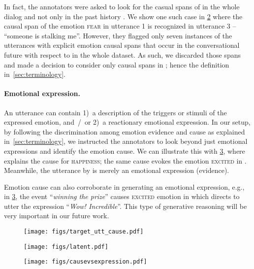 \documentclass[11pt,a4paper]{article}
\theoremstyle{definition}
\newcommand\emo[1]{\textsc{#1}}
\newcommand\ToDeleteIfNeedSpace{}
\begin{document}
In fact, the annotators were asked to look for the casual spans of  in the whole dialog and not only in the past history . We show one such case in \cref{fig:latent_cause} where the causal span of the emotion \emo{fear} in utterance 1 is recognized in utterance 3 -- ``someone is stalking me''.
However, they flagged only seven instances of the utterances with explicit emotion causal spans that occur in the conversational future with respect to  in the whole dataset.
As such, we discarded those spans and made a decision to consider only causal spans in ; hence the definition in~\cref{sec:terminology}.

\paragraph{Emotional expression.}
An utterance can contain 1)~a description of the triggers or stimuli of the expressed emotion, and~/~or 2)~a reactionary emotional expression. 
In our setup, by following the discrimination among emotion evidence and cause as explained in~\cref{sec:terminology}, we instructed the annotators to look beyond just emotional expressions and 
identify the 
emotion cause. We can illustrate this with
\cref{fig:causevsexpression}, where  explains the cause for \emo{happiness}; the same cause evokes the emotion \emo{excited} in . Meanwhile, the utterance  by  is merely an emotional expression (evidence).


\ToDeleteIfNeedSpace Emotion cause can also corroborate in generating an emotional expression, e.g., in \cref{fig:causevsexpression}, the event ``\textit{winning the prize}'' causes \emo{excited} emotion in  which directs  to utter the expression ``\textit{Wow! Incredible}''. This type of generative reasoning will be very important in our future work.

\begin{figure*}[t]
     \centering
     \begin{subfigure}[b]{0.33\textwidth}
         \centering
         \texttt{[image: figs/target\_utt\_cause.pdf]}
         \caption{}
         \label{fig:emotion_in_target}
     \end{subfigure}
     \hfill
     \begin{subfigure}[b]{0.3\textwidth}
         \centering
         \texttt{[image: figs/latent.pdf]}
         \caption{}
         \label{fig:latent_cause}
     \end{subfigure}
     \hfill
     \begin{subfigure}[b]{0.33\textwidth}
         \centering
         \texttt{[image: figs/causevsexpression.pdf]}
         \caption{}
         \label{fig:causevsexpression}
     \end{subfigure}
     \caption{\footnotesize{{No context: \ref{fig:emotion_in_target}}. {Unmentioned Latent Cause: \ref{fig:latent_cause}}. {Distinguishing emotion cause from emotional expressions: \ref{fig:causevsexpression}}}.}
\end{figure*}
\end{document}
